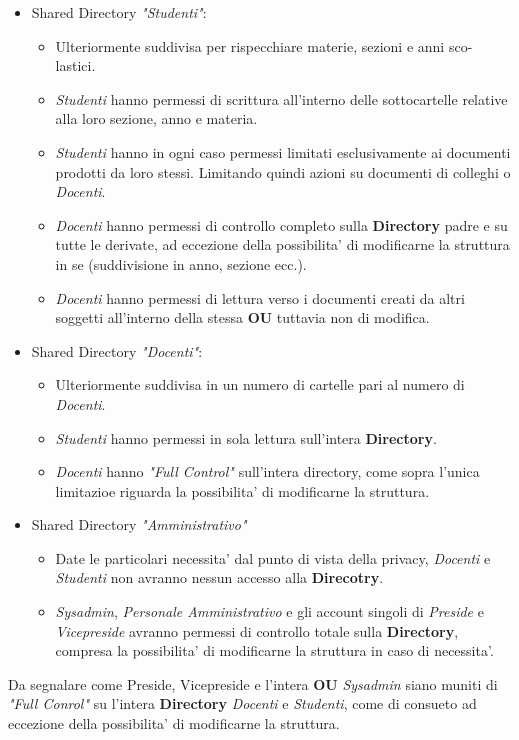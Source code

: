 \documentclass{report}
\begin{document}
				\begin{itemize}
					\item Shared Directory \textit{"Studenti"}:
						\begin{itemize}
							\item Ulteriormente suddivisa per rispecchiare materie, sezioni e anni sco-\\lastici.
							\item \emph{Studenti} hanno permessi di scrittura all'interno delle sottocartelle relative
								alla loro sezione, anno e materia.
							\item \emph{Studenti} hanno in ogni caso permessi limitati esclusivamente ai documenti
								prodotti da loro stessi. Limitando quindi azioni su documenti di colleghi o \emph{Docenti}.
							\item \emph{Docenti} hanno permessi di controllo completo sulla \textbf{Directory} padre
								e su tutte le derivate, ad eccezione della possibilita' di modificarne la struttura in se
								(suddivisione in anno, sezione ecc.).
							\item \emph{Docenti} hanno permessi di lettura verso i documenti creati da altri soggetti
								all'interno della stessa \textbf{OU} tuttavia non di modifica.
						\end{itemize}
					\item Shared Directory \textit{"Docenti"}:
						\begin{itemize}
							\item Ulteriormente suddivisa in un numero di cartelle pari al numero di \emph{Docenti}.
							\item \emph{Studenti} hanno permessi in sola lettura sull'intera \textbf{Directory}.
							\item \emph{Docenti} hanno \emph{"Full Control"} sull'intera directory, come sopra 
								l'unica limitazioe riguarda la possibilita' di modificarne la struttura.
						\end{itemize}
					\item Shared Directory \textit{"Amministrativo"}
						\begin{itemize}
							\item Date le particolari necessita' dal punto di vista della privacy, \emph{Docenti} e
								\emph{Studenti} non avranno nessun accesso alla \textbf{Direcotry}.
							\item \emph{Sysadmin}, \emph{Personale Amministrativo} e gli account singoli di
								\emph{Preside} e \emph{Vicepreside} avranno permessi di controllo totale sulla
								\textbf{Directory}, compresa la possibilita' di modificarne la struttura in caso
								di necessita'.
						\end{itemize}
				\end{itemize}
				Da segnalare come Preside, Vicepreside e l'intera \textbf{OU} \emph{Sysadmin} siano muniti di
				\emph{"Full Conrol"} su l'intera \textbf{Directory} \emph{Docenti} e \emph{Studenti}, come di
				consueto ad eccezione della possibilita' di modificarne la struttura.
\end{document}
